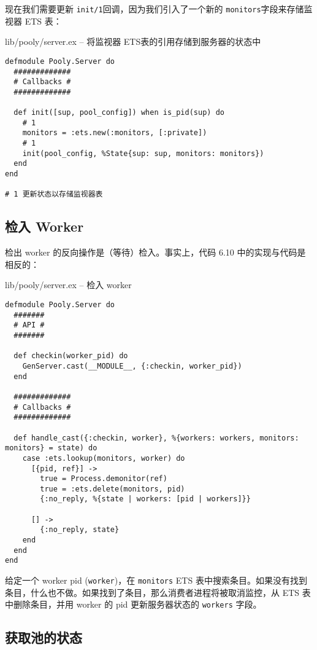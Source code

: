 现在我们需要更新 \texttt{init/1}回调，因为我们引入了一个新的 \texttt{monitors}字段来存储监视器 ETS 表：
\begin{code}{lib/pooly/server.ex -- 将监视器 ETS表的引用存储到服务器的状态中}
\begin{verbatim}
defmodule Pooly.Server do
  #############
  # Callbacks #
  #############

  def init([sup, pool_config]) when is_pid(sup) do
    # 1
    monitors = :ets.new(:monitors, [:private])
    # 1
    init(pool_config, %State{sup: sup, monitors: monitors})
  end
end

# 1 更新状态以存储监视器表
\end{verbatim}
\end{code}



 \subsection{ 检入 Worker}

检出 worker 的反向操作是（等待）检入。事实上，代码 6.10 中的实现与代码是相反的：
\begin{code}{lib/pooly/server.ex -- 检入 worker}

\begin{verbatim}
defmodule Pooly.Server do
  #######
  # API #
  #######

  def checkin(worker_pid) do
    GenServer.cast(__MODULE__, {:checkin, worker_pid})
  end

  #############
  # Callbacks #
  #############

  def handle_cast({:checkin, worker}, %{workers: workers, monitors: monitors} = state) do
    case :ets.lookup(monitors, worker) do
      [{pid, ref}] ->
        true = Process.demonitor(ref)
        true = :ets.delete(monitors, pid)
        {:no_reply, %{state | workers: [pid | workers]}}

      [] ->
        {:no_reply, state}
    end
  end
end
\end{verbatim}
\end{code}

给定一个 worker pid (\texttt{worker})，在
\texttt{monitors} ETS
表中搜索条目。如果没有找到条目，什么也不做。如果找到了条目，那么消费者进程将被取消监控，从
ETS 表中删除条目，并用 worker 的 pid 更新服务器状态的
\texttt{workers} 字段。


\subsection{获取池的状态}

